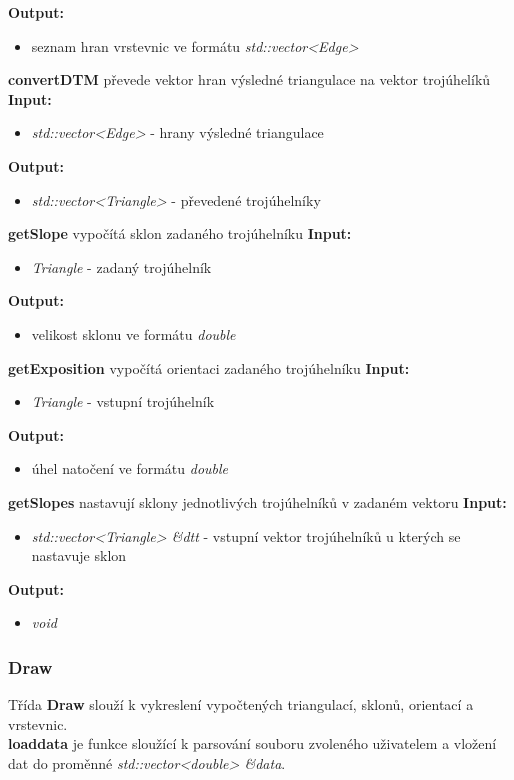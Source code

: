 \documentclass{article}
\begin{document}
 \textbf{Output:}
\begin{itemize} 
\item seznam hran vrstevnic ve formátu \textit{std::vector<Edge>}
\end{itemize}
\bigskip
\textbf{convertDTM} převede vektor hran výsledné triangulace na vektor trojúhelíků
 \textbf{Input:}
\begin{itemize} 
\item \textit{std::vector<Edge>} - hrany výsledné triangulace
\end{itemize}
 \textbf{Output:}
\begin{itemize} 
\item \textit{std::vector<Triangle>} - převedené trojúhelníky
\end{itemize}
\bigskip
\textbf{getSlope} vypočítá sklon zadaného trojúhelníku
 \textbf{Input:}
\begin{itemize} 
\item \textit{Triangle} - zadaný trojúhelník
\end{itemize}
 \textbf{Output:}
\begin{itemize} 
\item velikost sklonu ve formátu \textit{double}
\end{itemize}
\bigskip
\textbf{getExposition} vypočítá orientaci zadaného trojúhelníku
 \textbf{Input:}
\begin{itemize} 
\item \textit{Triangle} - vstupní trojúhelník
\end{itemize}
 \textbf{Output:}
\begin{itemize} 
\item úhel natočení ve formátu \textit{double}
\end{itemize}
\textbf{getSlopes} nastavují sklony jednotlivých trojúhelníků v zadaném vektoru
 \textbf{Input:}
\begin{itemize} 
\item \textit{std::vector<Triangle> \&dtt} - vstupní vektor trojúhelníků u kterých se nastavuje sklon
\end{itemize}
 \textbf{Output:}
\begin{itemize} 
\item \textit{void}
\end{itemize}
\bigskip 

\subsubsection{Draw} 
Třída \textbf{Draw} slouží k vykreslení vypočtených triangulací, sklonů, orientací a vrstevnic.\\
\textbf{loaddata} je funkce sloužící k parsování souboru zvoleného uživatelem a vložení dat do proměnné \textit{std::vector<double> \&data}. \\
\end{document}

